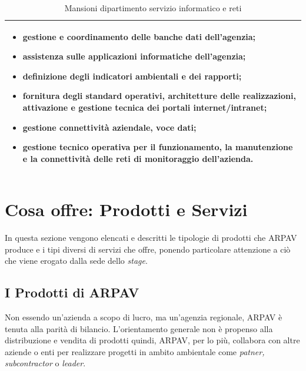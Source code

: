 \begin{table}[htbp]
\centering
\begin{tabular}{|p{}|}
\hline

\begin{itemize}

    \item gestione e coordinamento delle banche dati dell'agenzia;
	
	\item assistenza sulle applicazioni informatiche dell'agenzia;
	
	\item definizione degli indicatori ambientali e dei rapporti;
	
	\item fornitura degli standard operativi, architetture delle realizzazioni, attivazione e gestione tecnica dei portali internet/intranet;
	
	\item gestione connettività aziendale, voce dati;
	
	\item gestione tecnico operativa per il funzionamento, la manutenzione e la connettività delle reti di monitoraggio dell'azienda.
\end{itemize}
	\\
	
\hline
\end{tabular}
\caption{Mansioni dipartimento servizio informatico e reti}
\end{table}

\section{Cosa offre: Prodotti e Servizi}

In questa sezione vengono elencati e descritti le tipologie di prodotti che ARPAV produce e i tipi diversi di servizi che offre, ponendo particolare attenzione a ciò che viene erogato dalla sede dello \textit{stage}.

\subsection{I Prodotti di ARPAV}

Non essendo un'azienda a scopo di lucro, ma un'agenzia regionale, ARPAV è tenuta alla parità di bilancio. L'orientamento generale non è propenso alla distribuzione e vendita di prodotti quindi, ARPAV, per lo più, collabora con altre aziende o enti per realizzare progetti in ambito ambientale come \textit{patner, subcontractor} o \textit{leader}.




